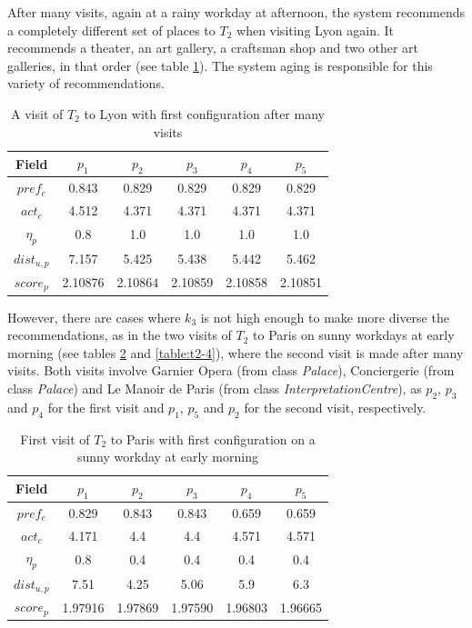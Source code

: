 After many visits, again at a rainy workday at afternoon, the system recommends a completely different set of places to $T_2$ when visiting Lyon again. It recommends a theater, an art gallery, a craftsman shop and two other art galleries, in that order (see table \ref{table:t2-2}). The system aging is responsible for this variety of recommendations.
\begin{table}[h!]
    \centering
    \begin{tabular}{ |c|c|c|c|c|c| } 
        \hline
        Field   & $p_1$ & $p_2$ & $p_3$ & $p_4$ & $p_5$ \\
        \hline
        $pref_c$    &  0.843 & 0.829 & 0.829 & 0.829 & 0.829 \\
        $act_c$     & 4.512 & 4.371 & 4.371 & 4.371 & 4.371 \\
        $\eta_p$    & 0.8 & 1.0 & 1.0 & 1.0 & 1.0 \\
        $dist_{u,p}$ & 7.157 & 5.425 & 5.438 & 5.442 & 5.462 \\
        $score_p$    & 2.10876 & 2.10864 & 2.10859 & 2.10858 & 2.10851 \\
        
        \hline
    \end{tabular}
    \caption{A visit of $T_2$ to Lyon with first configuration after many visits}
    \label{table:t2-2}
\end{table}

However, there are cases where $k_3$ is not high enough to make more diverse the recommendations, as in the two visits of $T_2$ to Paris on sunny workdays at early morning (see tables \ref{table:t2-3} and \ref{table:t2-4}), where the second visit is made after many visits. Both visits involve Garnier Opera (from class \textit{Palace}), Conciergerie (from class \textit{Palace}) and Le Manoir de Paris (from class \textit{InterpretationCentre}), as $p_2$, $p_3$ and $p_4$ for the first visit and $p_1$, $p_5$ and $p_2$ for the second visit, respectively.

\begin{table}[h!]
    \centering
    \begin{tabular}{ |c|c|c|c|c|c| } 
        \hline
        Field   & $p_1$ & $p_2$ & $p_3$ & $p_4$ & $p_5$ \\
        \hline
        $pref_c$    &  0.829 & 0.843 & 0.843 & 0.659 & 0.659 \\
        $act_c$     & 4.171 & 4.4 & 4.4 & 4.571 & 4.571 \\
        $\eta_p$    & 0.8 & 0.4 & 0.4 & 0.4 & 0.4 \\
        $dist_{u,p}$ & 7.51 & 4.25 & 5.06 & 5.9 & 6.3 \\
        $score_p$    & 1.97916 & 1.97869 & 1.97590 & 1.96803 & 1.96665 \\
        
        \hline
    \end{tabular}
    \caption{First visit of $T_2$ to Paris with first configuration on a sunny workday at early morning}
    \label{table:t2-3}
\end{table}

